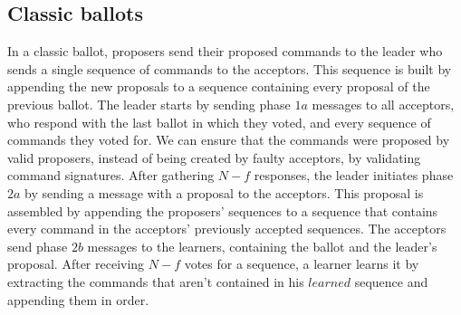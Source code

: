 \subsection{Classic ballots} 

In a classic ballot, proposers send their proposed commands to the leader who sends a single sequence of commands to the acceptors. This sequence is built by appending the new proposals to a sequence containing every proposal of the previous ballot. The leader starts by sending phase $1a$ messages to all acceptors, who respond with the last ballot in which they voted, and every sequence of commands they voted for. We can ensure that the commands were proposed by valid proposers, instead of being created by faulty acceptors, by validating command signatures. After gathering $N-f$ responses, the leader initiates phase $2a$ by sending a message with a proposal to the acceptors. This proposal is assembled by appending the proposers' sequences to a sequence that contains every command in the acceptors' previously accepted sequences. The acceptors send phase $2b$ messages to the learners, containing the ballot and the leader's proposal. After receiving $N-f$ votes for a sequence, a learner learns it by extracting the commands that aren't contained in his $learned$ sequence and appending them in order.

